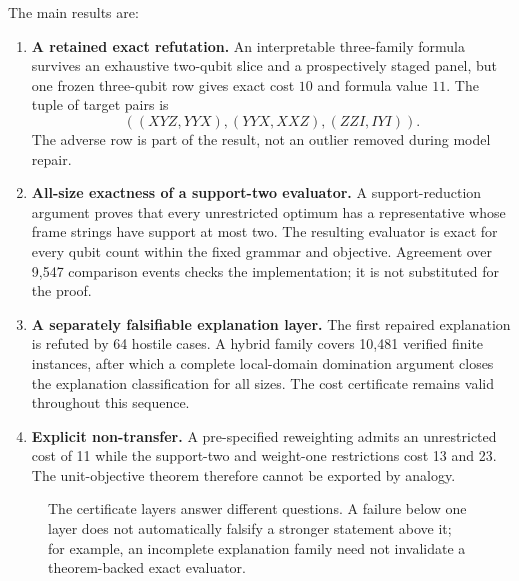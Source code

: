 The main results are:
\begin{enumerate}
  \item \textbf{A retained exact refutation.} An interpretable three-family formula survives an exhaustive two-qubit slice and a prospectively staged panel, but one frozen three-qubit row gives exact cost $10$ and formula value $11$. The tuple of target pairs is
  \[
  ((XYZ,YYX),(YYX,XXZ),(ZZI,IYI)).
  \]
  The adverse row is part of the result, not an outlier removed during model repair.
  \item \textbf{All-size exactness of a support-two evaluator.} A support-reduction argument proves that every unrestricted optimum has a representative whose frame strings have support at most two. The resulting evaluator is exact for every qubit count within the fixed grammar and objective. Agreement over 9,547 comparison events checks the implementation; it is not substituted for the proof.
  \item \textbf{A separately falsifiable explanation layer.} The first repaired explanation is refuted by 64 hostile cases. A hybrid family covers 10,481 verified finite instances, after which a complete local-domain domination argument closes the explanation classification for all sizes. The cost certificate remains valid throughout this sequence.
  \item \textbf{Explicit non-transfer.} A pre-specified reweighting admits an unrestricted cost of 11 while the support-two and weight-one restrictions cost 13 and 23. The unit-objective theorem therefore cannot be exported by analogy.
\end{enumerate}

\begin{figure}[t]
\centering
{}
\caption{The certificate layers answer different questions. A failure below one layer does not automatically falsify a stronger statement above it; for example, an incomplete explanation family need not invalidate a theorem-backed exact evaluator.}
\label{fig:layers}
\end{figure}

